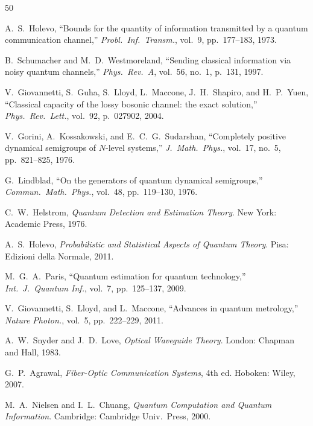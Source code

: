 \documentclass[journal,twocolumn]{IEEEtran}
\theoremstyle{definition}
\theoremstyle{plain}
\begin{document}
\begin{thebibliography}{50}


A.~S.~Holevo, ``Bounds for the quantity of information transmitted by
a quantum communication channel,'' \emph{Probl.\ Inf.\ Transm.},
vol.~9, pp.~177--183, 1973.

B.~Schumacher and M.~D.~Westmoreland, ``Sending classical information
via noisy quantum channels,'' \emph{Phys.\ Rev.\ A}, vol.~56, no.~1,
p.~131, 1997.

V.~Giovannetti, S.~Guha, S.~Lloyd, L.~Maccone, J.~H.~Shapiro, and
H.~P.~Yuen, ``Classical capacity of the lossy bosonic channel: the
exact solution,'' \emph{Phys.\ Rev.\ Lett.}, vol.~92, p.~027902, 2004.

V.~Gorini, A.~Kossakowski, and E.~C.~G.~Sudarshan, ``Completely
positive dynamical semigroups of $N$-level systems,''
\emph{J.\ Math.\ Phys.}, vol.~17, no.~5, pp.~821--825, 1976.

G.~Lindblad, ``On the generators of quantum dynamical semigroups,''
\emph{Commun.\ Math.\ Phys.}, vol.~48, pp.~119--130, 1976.

C.~W.~Helstrom, \emph{Quantum Detection and Estimation Theory}.
New York: Academic Press, 1976.

A.~S.~Holevo, \emph{Probabilistic and Statistical Aspects of Quantum
Theory}. Pisa: Edizioni della Normale, 2011.

M.~G.~A.~Paris, ``Quantum estimation for quantum technology,''
\emph{Int.\ J.\ Quantum Inf.}, vol.~7, pp.~125--137, 2009.

V.~Giovannetti, S.~Lloyd, and L.~Maccone, ``Advances in quantum
metrology,'' \emph{Nature Photon.}, vol.~5, pp.~222--229, 2011.

A.~W.~Snyder and J.~D.~Love, \emph{Optical Waveguide Theory}.
London: Chapman and Hall, 1983.

G.~P.~Agrawal, \emph{Fiber-Optic Communication Systems}, 4th ed.
Hoboken: Wiley, 2007.

M.~A.~Nielsen and I.~L.~Chuang,
\emph{Quantum Computation and Quantum Information}.
Cambridge: Cambridge Univ.\ Press, 2000.


\end{thebibliography}
\end{document}
